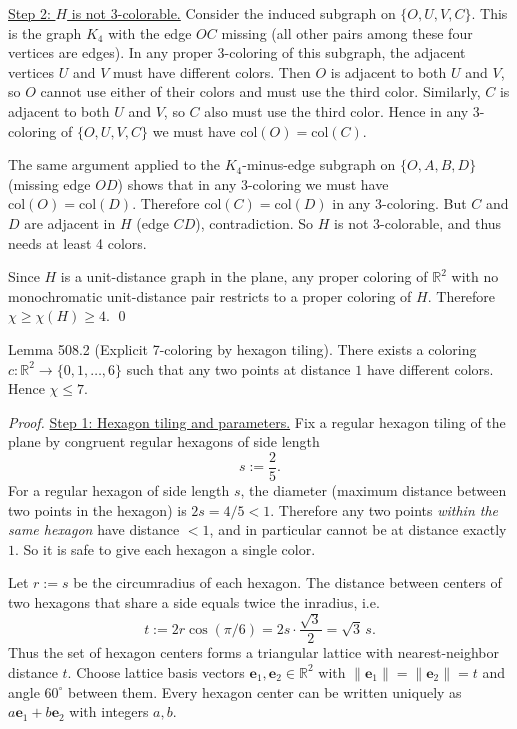 \underline{Step 2: $H$ is not 3-colorable.}
Consider the induced subgraph on $\{O,U,V,C\}$.
This is the graph $K_4$ with the edge $OC$ missing (all other pairs among these four vertices are edges).
In any proper 3-coloring of this subgraph, the adjacent vertices $U$ and $V$ must have different colors.
Then $O$ is adjacent to both $U$ and $V$, so $O$ cannot use either of their colors and must use the third color.
Similarly, $C$ is adjacent to both $U$ and $V$, so $C$ also must use the third color.
Hence in any 3-coloring of $\{O,U,V,C\}$ we must have $\mathrm{col}(O)=\mathrm{col}(C)$.

The same argument applied to the $K_4$-minus-edge subgraph on $\{O,A,B,D\}$ (missing edge $OD$) shows that in any 3-coloring we must have $\mathrm{col}(O)=\mathrm{col}(D)$.
Therefore $\mathrm{col}(C)=\mathrm{col}(D)$ in any 3-coloring.
But $C$ and $D$ are adjacent in $H$ (edge $CD$), contradiction.
So $H$ is not 3-colorable, and thus needs at least 4 colors.

Since $H$ is a unit-distance graph in the plane, any proper coloring of $\mathbb R^2$ with no monochromatic unit-distance pair restricts to a proper coloring of $H$.
Therefore $\chi\ge \chi(H)\ge 4$.
\qed

Lemma 508.2 (Explicit 7-coloring by hexagon tiling).
There exists a coloring $c:\mathbb R^2\to\{0,1,\dots,6\}$ such that any two points at distance $1$ have different colors. Hence $\chi\le 7$.

\emph{Proof.}
\underline{Step 1: Hexagon tiling and parameters.}
Fix a regular hexagon tiling of the plane by congruent regular hexagons of side length
\[s:=\frac{2}{5}.
\]
For a regular hexagon of side length $s$, the diameter (maximum distance between two points in the hexagon) is $2s=4/5<1$.
Therefore any two points \emph{within the same hexagon} have distance $<1$, and in particular cannot be at distance exactly $1$.
So it is safe to give each hexagon a single color.

Let $r:=s$ be the circumradius of each hexagon. The distance between centers of two hexagons that share a side equals twice the inradius, i.e.
\[t:=2r\cos(\pi/6)=2s\cdot \frac{\sqrt3}{2}=\sqrt3\,s.
\]
Thus the set of hexagon centers forms a triangular lattice with nearest-neighbor distance $t$.
Choose lattice basis vectors $\mathbf e_1,\mathbf e_2\in\mathbb R^2$ with $\lVert\mathbf e_1\rVert=\lVert\mathbf e_2\rVert=t$ and angle $60^\circ$ between them.
Every hexagon center can be written uniquely as $a\mathbf e_1+b\mathbf e_2$ with integers $a,b$.

